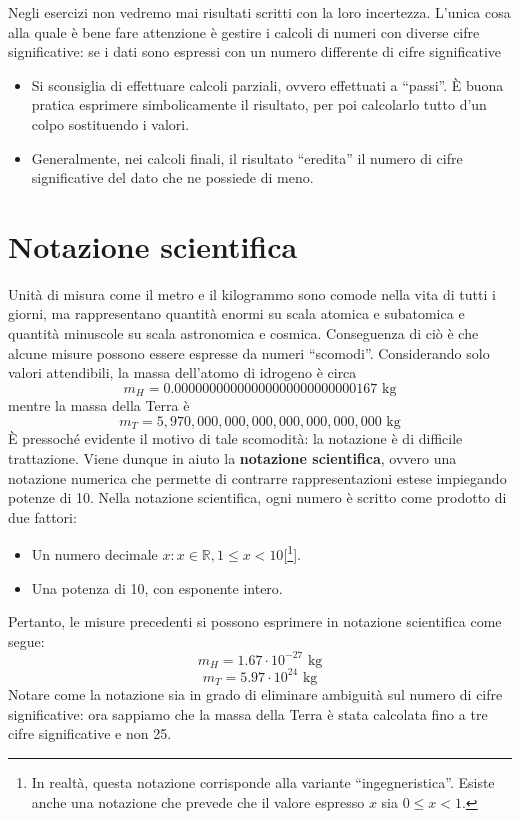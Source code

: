 Negli esercizi non vedremo mai risultati scritti con la loro incertezza. L'unica
cosa alla quale è bene fare attenzione è gestire i calcoli di numeri con diverse cifre
significative: se i dati sono espressi con un numero differente di cifre significative
\begin{itemize}
    \item Si sconsiglia di effettuare calcoli parziali, ovvero effettuati a ``passi''.
    È buona pratica esprimere simbolicamente il risultato, per poi calcolarlo tutto d'un
    colpo sostituendo i valori.

    \item Generalmente, nei calcoli finali, il risultato ``eredita'' il numero di cifre
    significative del dato che ne possiede di meno.
\end{itemize}

\section{Notazione scientifica}
Unità di misura come il metro e il kilogrammo sono comode nella vita di tutti i
giorni, ma rappresentano quantità enormi su scala atomica e subatomica e quantità
minuscole su scala astronomica e cosmica. Conseguenza di ciò è che alcune misure
possono essere espresse da numeri ``scomodi''. Considerando solo valori attendibili,
la massa dell'atomo di idrogeno è circa
\[ m_H = 0.000 000 000 000 000 000 000 000 001 67 \text{ kg} \]
mentre la massa della Terra è
\[ m_T = 5,970,000,000,000,000,000,000,000 \text{ kg} \]
È pressoché evidente il motivo di tale scomodità: la notazione è di difficile
trattazione. Viene dunque in aiuto la \textbf{notazione scientifica}, ovvero una
notazione numerica che permette di contrarre rappresentazioni estese impiegando
potenze di 10. Nella notazione scientifica, ogni numero è scritto come prodotto
di due fattori:
\begin{itemize}
    \item Un numero decimale $x:x\in \mathbb{R}, 1\leq x < 10$[\footnote{In realtà, questa notazione corrisponde alla variante ``ingegneristica''. Esiste anche una notazione che prevede che il valore espresso $x$ sia $0\leq x < 1$.}].
    \item Una potenza di 10, con esponente intero.
\end{itemize}
Pertanto, le misure precedenti si possono esprimere in notazione scientifica come
segue:
\[ m_H = 1.67 \cdot 10^{-27} \text{ kg} \]
\[ m_T = 5.97 \cdot 10^{24} \text{ kg}\]
Notare come la notazione sia in grado di eliminare ambiguità sul numero di cifre
significative: ora sappiamo che la massa della Terra è stata calcolata fino a
tre cifre significative e non 25.

